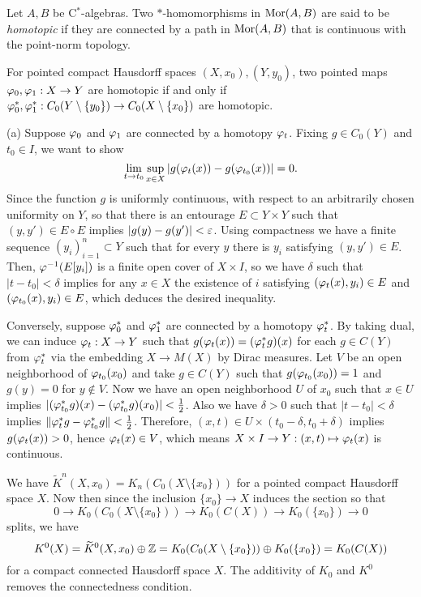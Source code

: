 \documentclass{../../large}
\begin{document}
\begin{prb}
Let $A,B$ be C$^*$-algebras.
Two $*$-homomorphisms in $\operatorname{Mor}(A,B)$ are said to be \emph{homotopic} if they are connected by a path in $\operatorname{Mor}(A,B)$ that is continuous with the point-norm topology.
\begin{parts}
\item For pointed compact Hausdorff spaces $(X,x_0),(Y,y_0)$, two pointed maps $\varphi_0,\varphi_1:X\to Y$ are homotopic if and only if $\varphi_0^*,\varphi_1^*:C_0(Y\setminus\{y_0\})\to C_0(X\setminus\{x_0\})$ are homotopic.
\end{parts}
\end{prb}
\begin{pf}
(a)
Suppose $\varphi_0$ and $\varphi_1$ are connected by a homotopy $\varphi_t$.
Fixing $g\in C_0(Y)$ and $t_0\in I$, we want to show
\[\lim_{t\to t_0}\sup_{x\in X}|g(\varphi_t(x))-g(\varphi_{t_0}(x))|=0.\]
Since the function $g$ is uniformly continuous, with respect to an arbitrarily chosen uniformity on $Y$, so that there is an entourage $E\subset Y\times Y$ such that $(y,y')\in E\circ E$ implies $|g(y)-g(y')|<\varepsilon$.
Using compactness we have a finite sequence $(y_i)_{i=1}^n\subset Y$ such that for every $y$ there is $y_i$ satisfying $(y,y')\in E$.
Then, $\varphi^{-1}(E[y_i])$ is a finite open cover of $X\times I$, so we have $\delta$ such that $|t-t_0|<\delta$ implies for any $x\in X$ the existence of $i$ satisfying $(\varphi_t(x),y_i)\in E$ and $(\varphi_{t_0}(x),y_i)\in E$, which deduces the desired inequality.

Conversely, suppose $\varphi_0^*$ and $\varphi_1^*$ are connected by a homotopy $\varphi_t^*$.
By taking dual, we can induce $\varphi_t:X\to Y$ such that $g(\varphi_t(x))=(\varphi_t^*g)(x)$ for each $g\in C(Y)$ from $\varphi_t^*$ via the embedding $X\to M(X)$ by Dirac measures.
Let $V$ be an open neighborhood of $\varphi_{t_0}(x_0)$ and take $g\in C(Y)$ such that $g(\varphi_{t_0}(x_0))=1$ and $g(y)=0$ for $y\notin V$.
Now we have an open neighborhood $U$ of $x_0$ such that $x\in U$ implies $|(\varphi_{t_0}^*g)(x)-(\varphi_{t_0}^*g)(x_0)|<\frac12$.
Also we have $\delta>0$ such that $|t-t_0|<\delta$ implies $\|\varphi_t^*g-\varphi_{t_0}^*g\|<\frac12$.
Therefore, $(x,t)\in U\times(t_0-\delta,t_0+\delta)$ implies $g(\varphi_t(x))>0$, hence $\varphi_t(x)\in V$, which means $X\times I\to Y:(x,t)\mapsto\varphi_t(x)$ is continuous.
\end{pf}

We have $\tilde K^n(X,x_0)=K_n(C_0(X\setminus\{x_0\}))$ for a pointed compact Hausdorff space $X$.
Now then since the inclusion $\{x_0\}\to X$ induces the section so that
\[0\to K_0(C_0(X\setminus\{x_0\}))\to K_0(C(X))\to K_0(\{x_0\})\to0\]
splits, we have
\[K^0(X)=\widetilde K^0(X,x_0)\oplus\mathbb{Z}=K_0(C_0(X\setminus\{x_0\}))\oplus K_0(\{x_0\})=K_0(C(X))\]
for a compact connected Hausdorff space $X$.
The additivity of $K_0$ and $K^0$ removes the connectedness condition.
\end{document}
